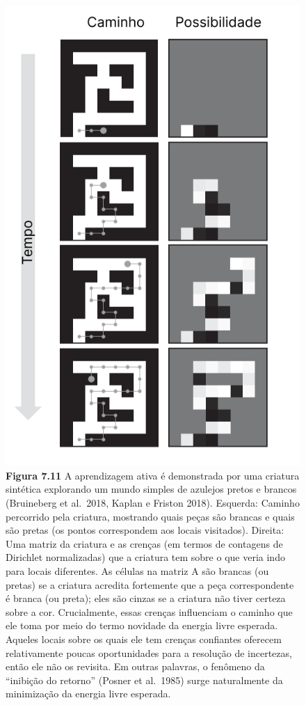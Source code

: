 \documentclass[
  12pt,
]{book}
\begin{document}
\begin{figure}
\centering
\includegraphics{images/Figura_7_11.png}
\caption{\textbf{Figura 7.11} A aprendizagem ativa é demonstrada por uma criatura sintética explorando um mundo simples de azulejos pretos e brancos (Bruineberg et al.~2018, Kaplan e Friston 2018). Esquerda: Caminho percorrido pela criatura, mostrando quais peças são brancas e quais são pretas (os pontos correspondem aos locais visitados). Direita: Uma matriz da criatura e as crenças (em termos de contagens de Dirichlet normalizadas) que a criatura tem sobre o que veria indo para locais diferentes. As células na matriz A são brancas (ou pretas) se a criatura acredita fortemente que a peça correspondente é branca (ou preta); eles são cinzas se a criatura não tiver certeza sobre a cor. Crucialmente, essas crenças influenciam o caminho que ele toma por meio do termo novidade da energia livre esperada. Aqueles locais sobre os quais ele tem crenças confiantes oferecem relativamente poucas oportunidades para a resolução de incertezas, então ele não os revisita. Em outras palavras, o fenômeno da ``inibição do retorno'' (Posner et al.~1985) surge naturalmente da minimização da energia livre esperada.}
\end{figure}
\end{document}
